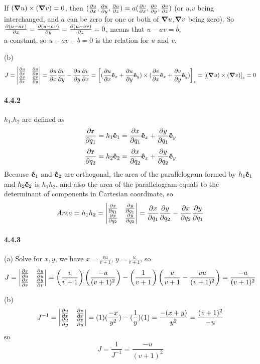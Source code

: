 \documentclass[a4paper]{article}
\begin{document}
If $(\del u)\times(\del v)=0$, then $(\pdv{u}{x},\pdv{u}{y},\pdv{u}{z})=a(\pdv{v}{x},\pdv{v}{y},\pdv{v}{z})$ (or $u$,$v$ being interchanged, and $a$ can be zero for one or both of $\del u$,$\del v$ being zero). So $\pdv{(u-av)}{x}=\pdv{(u-av)}{y}=\pdv{(u-av)}{z}=0$, means that $u-av=b$, \\a constant, so $u-av-b=0$ is the relation for $u$ and $v$.

(b) 
\[
J=
\begin{vmatrix}
\pdv{u}{x}&\pdv{u}{y}\\
\pdv{v}{x}&\pdv{v}{y}
\end{vmatrix}
=\pdv{u}{x}\pdv{v}{y}-\pdv{u}{y}\pdv{v}{x}
=\left[(\pdv{u}{x}\VE_x+ \pdv{u}{y}\VE_y)\times(\pdv{v}{x}\VE_x+\pdv{v}{y}\VE_y)\right]_z=\left[(\del u)\times(\del v)\right]_z=0
\]

\paragraph{4.4.2}
$h_1$,$h_2$ are defined as
\[
\pdv{\V{r}}{q_1}=h_1\VE_1=\pdv{x}{q_1}\VE_x+\pdv{y}{q_1}\VE_y
\]
\[
\pdv{\V{r}}{q_2}=h_2\VE_2=\pdv{x}{q_2}\VE_x+\pdv{y}{q_2}\VE_y
\]
Because $\VE_1$ and $\VE_2$ are orthogonal, the area of the parallelogram formed by $h_1\VE_1$ and $h_2\VE_2$ is $h_1h_2$, and also the area of the parallelogram equals to the determinant of components in Cartesian coordinate, so
\[
Area=h_1h_2=
\begin{vmatrix}
\pdv{x}{q_1}&\pdv{y}{q_1}\\
\pdv{x}{q_2}&\pdv{y}{q_2}\\
\end{vmatrix}=
\pdv{x}{q_1}\pdv{y}{q_2}-\pdv{x}{q_2}\pdv{y}{q_1}
\]

\paragraph{4.4.3}
(a) Solve for $x,y$, we have $x=\frac{vu}{v+1}$, $y=\frac{u}{v+1}$, so
\[
J=
\begin{vmatrix}
\pdv{x}{u}&\pdv{y}{u}\\
\pdv{x}{v}&\pdv{y}{v}\\
\end{vmatrix}=\left(\frac{v}{v+1}\right)\left(\frac{-u}{(v+1)^2}\right)-\left(\frac{1}{v+1}\right)\left(\frac{u}{v+1}-\frac{vu}{(v+1)^2}\right)=\frac{-u}{(v+1)^2}
\]

(b) 
\[
J^{-1}=
\begin{vmatrix}
\pdv{u}{x}&\pdv{v}{x}\\
\pdv{u}{y}&\pdv{v}{y}\\
\end{vmatrix}=(1)(\frac{-x}{y^2})-(\frac{1}{y})(1)=\frac{-(x+y)}{y^2}=\frac{(v+1)^2}{-u}
\]
so
\[
J=\frac{1}{J^{-1}}=\frac{-u}{(v+1)^2}
\]
\end{document}
